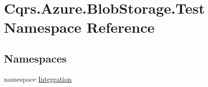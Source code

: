 \hypertarget{namespaceCqrs_1_1Azure_1_1BlobStorage_1_1Test}{}\section{Cqrs.\+Azure.\+Blob\+Storage.\+Test Namespace Reference}
\label{namespaceCqrs_1_1Azure_1_1BlobStorage_1_1Test}
\subsection*{Namespaces}
\begin{DoxyCompactItemize}
\item 
namespace \hyperlink{namespaceCqrs_1_1Azure_1_1BlobStorage_1_1Test_1_1Integration}{Integration}
\end{DoxyCompactItemize}
